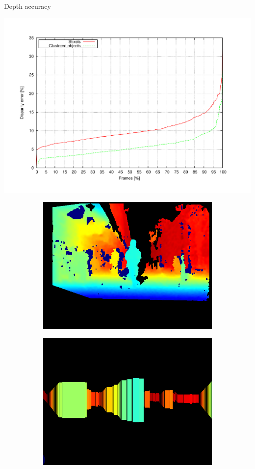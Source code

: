 \begin{frame}[plain]{Depth accuracy}
  \begin{center}
    \vskip-0.25cm
    \includegraphics[width=\textwidth,height=0.6\textwidth,trim=50 40 80 60,clip]{disparity}
    \vskip-0.5cm
    \begin{figure}
	  \centering
	  \begin{subfigure}[b]{0.3\textwidth}
	      \includegraphics[height=0.3\figuresheight]{elas}
	  \end{subfigure}%
	  \begin{subfigure}[b]{0.3\textwidth}
	      \includegraphics[height=0.3\figuresheight]{stixels}

\end{subfigure}
\end{figure}
\end{center}
\end{frame}
